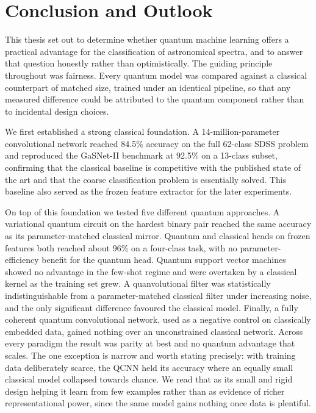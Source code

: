 \section{Conclusion and Outlook}
\label{sec:conclusion}

This thesis set out to determine whether quantum machine learning offers a practical
advantage for the classification of astronomical spectra, and to answer that question
honestly rather than optimistically. The guiding principle throughout was fairness.
Every quantum model was compared against a classical counterpart of matched size,
trained under an identical pipeline, so that any measured difference could be
attributed to the quantum component rather than to incidental design choices.

We first established a strong classical foundation. A 14-million-parameter
convolutional network reached 84.5\% accuracy on the full 62-class SDSS problem and
reproduced the GaSNet-II benchmark at 92.5\% on a 13-class subset, confirming that the
classical baseline is competitive with the published state of the art and that the
coarse classification problem is essentially solved. This baseline also served as the
frozen feature extractor for the later experiments.

On top of this foundation we tested five different quantum approaches. A variational
quantum circuit on the hardest binary pair reached the same accuracy as its
parameter-matched classical mirror. Quantum and classical heads on frozen features both
reached about 96\% on a four-class task, with no parameter-efficiency benefit for the
quantum head. Quantum support vector machines showed no advantage in the few-shot
regime and were overtaken by a classical kernel as the training set grew. A
quanvolutional filter was statistically indistinguishable from a parameter-matched
classical filter under increasing noise, and the only significant difference favoured
the classical model. Finally, a fully coherent quantum convolutional network, used as a
negative control on classically embedded data, gained nothing over an unconstrained
classical network. Across every paradigm the result was parity at best and no quantum
advantage that scales. The one exception is narrow and worth stating precisely: with
training data deliberately scarce, the QCNN held its accuracy where an equally small
classical model collapsed towards chance. We read that as its small and rigid design
helping it learn from few examples rather than as evidence of richer representational
power, since the same model gains nothing once data is plentiful.

